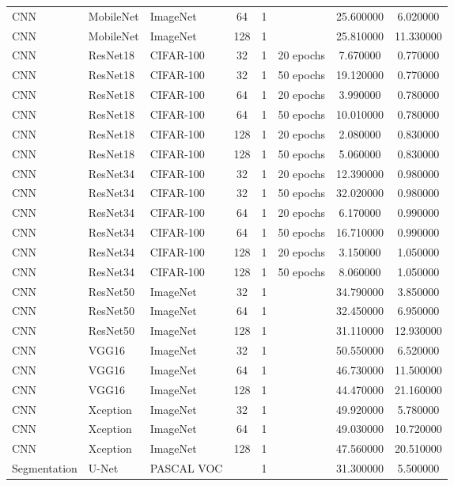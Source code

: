 \begin{table}
\begin{tabular}{lllccccc}
CNN & MobileNet & ImageNet & 64 & 1 &  & 25.600000 & 6.020000 \\
CNN & MobileNet & ImageNet & 128 & 1 &  & 25.810000 & 11.330000 \\
CNN & ResNet18 & CIFAR-100 & 32 & 1 & 20 epochs & 7.670000 & 0.770000 \\
CNN & ResNet18 & CIFAR-100 & 32 & 1 & 50 epochs & 19.120000 & 0.770000 \\
CNN & ResNet18 & CIFAR-100 & 64 & 1 & 20 epochs & 3.990000 & 0.780000 \\
CNN & ResNet18 & CIFAR-100 & 64 & 1 & 50 epochs & 10.010000 & 0.780000 \\
CNN & ResNet18 & CIFAR-100 & 128 & 1 & 20 epochs & 2.080000 & 0.830000 \\
CNN & ResNet18 & CIFAR-100 & 128 & 1 & 50 epochs & 5.060000 & 0.830000 \\
CNN & ResNet34 & CIFAR-100 & 32 & 1 & 20 epochs & 12.390000 & 0.980000 \\
CNN & ResNet34 & CIFAR-100 & 32 & 1 & 50 epochs & 32.020000 & 0.980000 \\
CNN & ResNet34 & CIFAR-100 & 64 & 1 & 20 epochs & 6.170000 & 0.990000 \\
CNN & ResNet34 & CIFAR-100 & 64 & 1 & 50 epochs & 16.710000 & 0.990000 \\
CNN & ResNet34 & CIFAR-100 & 128 & 1 & 20 epochs & 3.150000 & 1.050000 \\
CNN & ResNet34 & CIFAR-100 & 128 & 1 & 50 epochs & 8.060000 & 1.050000 \\
CNN & ResNet50 & ImageNet & 32 & 1 &  & 34.790000 & 3.850000 \\
CNN & ResNet50 & ImageNet & 64 & 1 &  & 32.450000 & 6.950000 \\
CNN & ResNet50 & ImageNet & 128 & 1 &  & 31.110000 & 12.930000 \\
CNN & VGG16 & ImageNet & 32 & 1 &  & 50.550000 & 6.520000 \\
CNN & VGG16 & ImageNet & 64 & 1 &  & 46.730000 & 11.500000 \\
CNN & VGG16 & ImageNet & 128 & 1 &  & 44.470000 & 21.160000 \\
CNN & Xception & ImageNet & 32 & 1 &  & 49.920000 & 5.780000 \\
CNN & Xception & ImageNet & 64 & 1 &  & 49.030000 & 10.720000 \\
CNN & Xception & ImageNet & 128 & 1 &  & 47.560000 & 20.510000 \\
Segmentation & U-Net & PASCAL VOC &  & 1 &  & 31.300000 & 5.500000 \\

\end{tabular}
\end{table}
